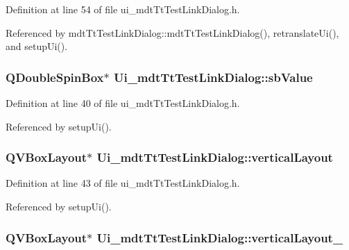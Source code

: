 Definition at line 54 of file ui\-\_\-mdt\-Tt\-Test\-Link\-Dialog.\-h.



Referenced by mdt\-Tt\-Test\-Link\-Dialog\-::mdt\-Tt\-Test\-Link\-Dialog(), retranslate\-Ui(), and setup\-Ui().

\hypertarget{class_ui__mdt_tt_test_link_dialog_a24249660bb0d0a11397d5e47e9a34833}{
\subsubsection[{sb\-Value}]{\setlength{\rightskip}{0pt plus 5cm}Q\-Double\-Spin\-Box$\ast$ Ui\-\_\-mdt\-Tt\-Test\-Link\-Dialog\-::sb\-Value}}\label{class_ui__mdt_tt_test_link_dialog_a24249660bb0d0a11397d5e47e9a34833}


Definition at line 40 of file ui\-\_\-mdt\-Tt\-Test\-Link\-Dialog.\-h.



Referenced by setup\-Ui().

\hypertarget{class_ui__mdt_tt_test_link_dialog_a72162d9dadbec5b9d50de91a8bbeff76}{
\subsubsection[{vertical\-Layout}]{\setlength{\rightskip}{0pt plus 5cm}Q\-V\-Box\-Layout$\ast$ Ui\-\_\-mdt\-Tt\-Test\-Link\-Dialog\-::vertical\-Layout}}\label{class_ui__mdt_tt_test_link_dialog_a72162d9dadbec5b9d50de91a8bbeff76}


Definition at line 43 of file ui\-\_\-mdt\-Tt\-Test\-Link\-Dialog.\-h.



Referenced by setup\-Ui().

\hypertarget{class_ui__mdt_tt_test_link_dialog_aeb75fc4b10ee89cd07501e9aec3d8f8a}{
\subsubsection[{vertical\-Layout\-\_\-2}]{\setlength{\rightskip}{0pt plus 5cm}Q\-V\-Box\-Layout$\ast$ Ui\-\_\-mdt\-Tt\-Test\-Link\-Dialog\-::vertical\-Layout\-\_}}\label{class_ui__mdt_tt_test_link_dialog_aeb75fc4b10ee89cd07501e9aec3d8f8a}


